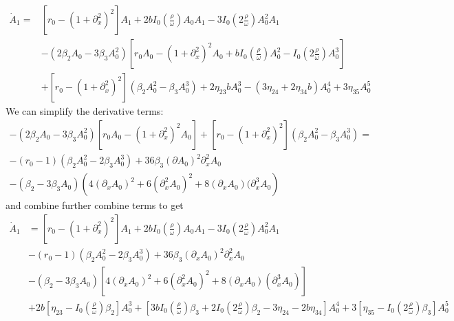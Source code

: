 \documentclass[pre,preprint,superscriptaddress]{revtex4-1}
\begin{document}
\begin{align}
\dot{A}_1=&\left[r_0 -\left(1+\partial_{x}^2\right)^2\right]A_1 + 2 b I_0(\tfrac{\rho}{\omega})A_0 A_ 1 - 3I_0(2\tfrac{\rho}{\omega}) A_0^2 A_1 \\ \nonumber
&-(2\beta_2 A_0-3\beta_3 A_0^2)\left[ r_0 A_0-\left(1+\partial_{x}^2\right)^2A_0+b I_0(\tfrac{\rho}{\omega}) A_0^2-I_0(2\tfrac{\rho}{\omega})A_0^3\right] \\ \nonumber
& + \left[r_0 -\left(1+\partial_{x}^2\right)^2\right](\beta_2 A_0^2 -\beta_3 A_0^3)
+ 2\eta_{23} b A_0^3 -(3\eta_{24}+2\eta_{34} b ) A_0^4 +3\eta_{35} A_0^5 
\end{align}
We can simplify the derivative terms:
\begin{align}
-(2\beta_2 A_0-3\beta_3 A_0^2)\left[ r_0 A_0-\left(1+\partial_{x}^2\right)^2A_0\right]+ \left[r_0-\left(1+\partial_{x}^2\right)^2\right](\beta_2 A_0^2 -\beta_3 A_0^3)= \\ \nonumber
-(r_0-1)(\beta_2 A_0^2 - 2\beta_3 A_0^3) +36\beta_3 (\partial A_0)^2\partial_x^2A_0\\ \nonumber
-(\beta_2-3\beta_3 A_0)\left( 4(\partial_xA_0)^2+6(\partial_x^2 A_0)^2+8(\partial_xA_0)(\partial_x^3A_0\right)
\end{align}
and combine further combine terms to get
\begin{align}
\dot{A}_1&=\left[r_0 -\left(1+\partial_{x}^2\right)^2\right]A_1 + 2 b I_0(\tfrac{\rho}{\omega})A_0 A_ 1 - 3I_0(2\tfrac{\rho}{\omega}) A_0^2 A_1 \\ \nonumber
&-(r_0-1)(\beta_2 A_0^2 - 2\beta_3 A_0^3) +36\beta_3 (\partial_x A_0)^2\partial_x^2A_0 \\ \nonumber
&-(\beta_2-3\beta_3 A_0)\left[ 4(\partial_xA_0)^2+6(\partial_x^2 A_0)^2+8(\partial_xA_0)(\partial_x^3A_0)\right] \\ \nonumber
&+2 b \left[\eta_{23}-I_0(\tfrac{\rho}{\omega})\beta_2\right]A_0^3 +\left[3 b I_0(\tfrac{\rho}{\omega})\beta_3+2 I_0(2\tfrac{\rho}{\omega})\beta_2-3\eta_{24}-2 b\eta_{34} \right]A_0^4+3\left[\eta_{35}- I_0(2\tfrac{\rho}{\omega})\beta_3\right]A_0^5
\end{align}
\end{document}
